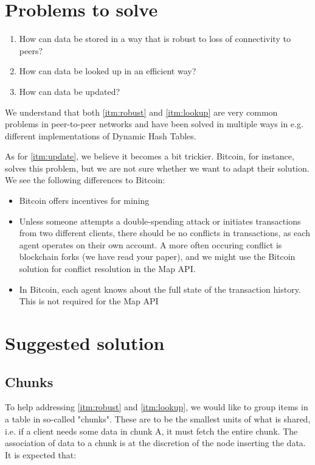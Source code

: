 \documentclass{article}
\begin{document}
\section{Problems to solve}

\begin{enumerate}
  \itemsep0em
  \item \label{itm:robust} How can data be stored in a way that is robust to 
    loss of connectivity to peers?
  \item \label{itm:lookup} How can data be looked up in an efficient way?
  \item \label{itm:update} How can data be updated?
\end{enumerate}

We understand that both \ref{itm:robust} and \ref{itm:lookup} are very common
problems in peer-to-peer networks and have been solved in multiple ways in
e.g. different implementations of Dynamic Hash Tables.

As for \ref{itm:update}, we believe it becomes a bit trickier. Bitcoin, for
instance, solves this problem, but we are not sure whether we want to adapt
their solution. We see the following differences to Bitcoin:

\begin{itemize}
  \itemsep0em
  \item Bitcoin offers incentives for mining
  \item Unless someone attempts a double-spending attack or initiates
    transactions from two different clients, there should be no conflicts in
    transactions, as each agent operates on their own account. A more often 
    occuring conflict is blockchain forks (we have read your paper), and we
    might use the Bitcoin solution for conflict resolution in the Map API.
  \item In Bitcoin, each agent knows about the full state of the transaction
    history. This is not required for the Map API
\end{itemize}

\section{Suggested solution}

\subsection{Chunks}

To help addressing \ref{itm:robust} and \ref{itm:lookup}, we would like to
group items in a table in so-called "chunks". These are to be the smallest units
of what is shared, i.e. if a client needs some data in chunk A, it must fetch
the entire chunk. The association of data to a chunk
is at the discretion of the node inserting the data. It is expected that:
\end{document}
